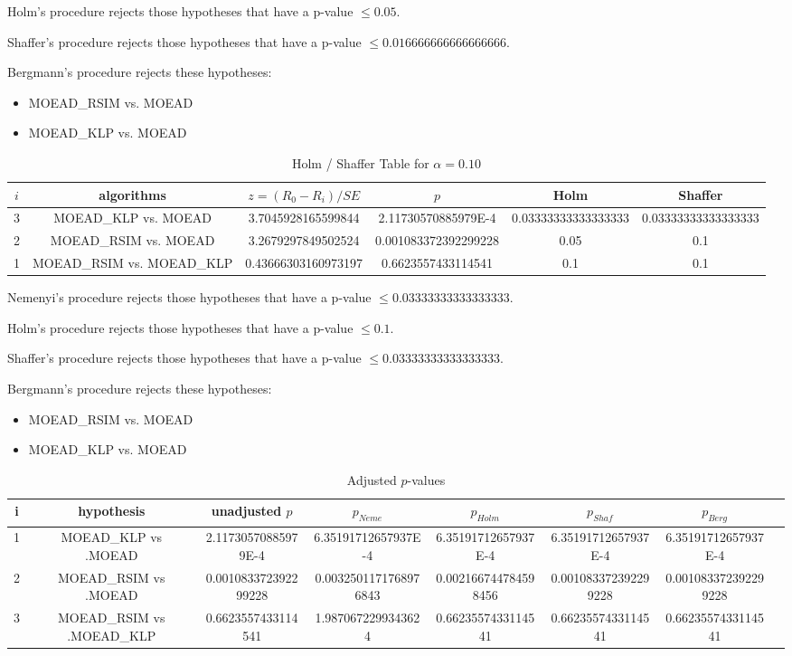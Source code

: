 \documentclass[a4paper,10pt]{article}
\begin{document}
\begin{landscape}
Holm's procedure rejects those hypotheses that have a p-value $\le0.05$.


Shaffer's procedure rejects those hypotheses that have a p-value $\le0.016666666666666666$.


Bergmann's procedure rejects these hypotheses:


\begin{itemize}


\item MOEAD_RSIM vs. MOEAD
\item MOEAD_KLP vs. MOEAD
\end{itemize}


\begin{table}[!htp]
\centering\tiny
\caption{Holm / Shaffer Table for $\alpha=0.10$}
\begin{tabular}{cccccc}
$i$&algorithms&$z=(R_0 - R_i)/SE$&$p$&Holm&Shaffer\\
\hline
3&MOEAD_KLP vs. MOEAD&3.7045928165599844&2.11730570885979E-4&0.03333333333333333&0.03333333333333333\\
2&MOEAD_RSIM vs. MOEAD&3.2679297849502524&0.001083372392299228&0.05&0.1\\
1&MOEAD_RSIM vs. MOEAD_KLP&0.43666303160973197&0.6623557433114541&0.1&0.1\\
\hline
\end{tabular}
\end{table}
Nemenyi's procedure rejects those hypotheses that have a p-value $\le0.03333333333333333$.


Holm's procedure rejects those hypotheses that have a p-value $\le0.1$.


Shaffer's procedure rejects those hypotheses that have a p-value $\le0.03333333333333333$.


Bergmann's procedure rejects these hypotheses:


\begin{itemize}


\item MOEAD_RSIM vs. MOEAD
\item MOEAD_KLP vs. MOEAD
\end{itemize}


\begin{table}[!htp]
\centering\tiny
\caption{Adjusted $p$-values}
\begin{tabular}{cccccccc}
i&hypothesis&unadjusted $p$&$p_{Neme}$&$p_{Holm}$&$p_{Shaf}$&$p_{Berg}$\\
\hline
1&MOEAD_KLP vs .MOEAD&2.11730570885979E-4&6.35191712657937E-4&6.35191712657937E-4&6.35191712657937E-4&6.35191712657937E-4\\
2&MOEAD_RSIM vs .MOEAD&0.001083372392299228&0.0032501171768976843&0.002166744784598456&0.001083372392299228&0.001083372392299228\\
3&MOEAD_RSIM vs .MOEAD_KLP&0.6623557433114541&1.9870672299343624&0.6623557433114541&0.6623557433114541&0.6623557433114541\\
\hline
\end{tabular}
\end{table}

\end{landscape}
\end{document}
